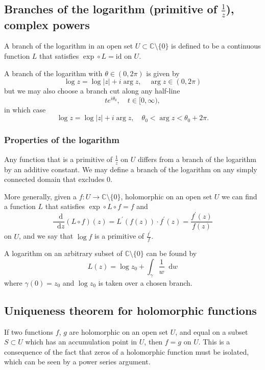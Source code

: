 \documentclass{article}
\newcommand\dif{\mathop{}\!\mathrm{d}}
\begin{document}
\subsection{Branches of the logarithm (primitive of $\frac{1}{z}$),
                  complex powers}

A branch of the logarithm in an open set
$U \subset \mathbb{C} \setminus \{ 0 \}$ is defined to be
a continuous function $L$ that satisfies
$\exp \circ L = \mathrm{id}$ on $U$.

A branch of the logarithm with $\theta \in (0, 2 \pi)$ is
given by
$$
  \log z
= \log |z| + i \arg z, \quad
  \arg z \in (0, 2 \pi)
$$
but we may also choose a branch cut along any half-line
$$
  t e^{i \theta_0}, \quad
  t \in [0, \infty),
$$
in which case
$$
  \log z
= \log |z| + i \arg z, \quad
  \theta_0 < \arg z < \theta_0 + 2 \pi.
$$

\subsubsection{Properties of the logarithm}
Any function that is a primitive of $\frac{1}{z}$ on $U$
differs from a branch of the logarithm by an additive
constant. We may define a branch of the logarithm on
any simply connected domain that excludes 0.

More generally, given a
$f: U \to \mathbb{C} \setminus \{ 0 \}$,
holomorphic on an open set $U$
we can find a function $L$ that satisfies
$\exp \circ L \circ f = f$ and
$$
  \frac{\dif}{\dif z}
  (L \circ f)(z)
= L^\prime(f(z)) \cdot f^\prime(z)
= \frac{f^\prime(z)}
       {f(z)}
$$
on $U$, and we say that $\log f$ is a primitive of
$\frac{f^\prime}{f}$.

A logarithm on an arbitrary subset of
$\mathbb{C} \setminus \{ 0 \}$ can be found by
$$
  L(z)
= \log z_0 + \int_\gamma \frac{1}{w} \dif w
$$
where $\gamma(0) = z_0$ and $\log z_0$ is taken over a chosen
branch.

\subsection{Uniqueness theorem for holomorphic functions}

If two functions $f$, $g$ are holomorphic on an open set
$U$, and equal on a subset $S \subset U$ which has an
accumulation point in $U$, then $f = g$ on $U$. This is a
consequence of the fact that zeros of a holomorphic function
must be isolated, which can be seen by a power series
argument.
\end{document}
